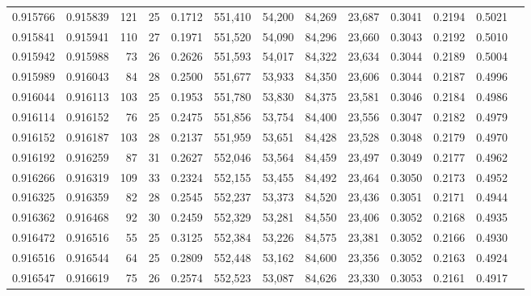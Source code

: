 \begin{tabular}{rrrrrrrrrrrrr}
0.915766 & 0.915839 &   121 &  25 &                                     0.1712 & 551,410 &  54,200 &  84,269 &  23,687 & 0.3041 & 0.2194 & 0.5021 \\
0.915841 & 0.915941 &   110 &  27 &                                     0.1971 & 551,520 &  54,090 &  84,296 &  23,660 & 0.3043 & 0.2192 & 0.5010 \\
0.915942 & 0.915988 &    73 &  26 &                                     0.2626 & 551,593 &  54,017 &  84,322 &  23,634 & 0.3044 & 0.2189 & 0.5004 \\
0.915989 & 0.916043 &    84 &  28 &                                     0.2500 & 551,677 &  53,933 &  84,350 &  23,606 & 0.3044 & 0.2187 & 0.4996 \\
0.916044 & 0.916113 &   103 &  25 &                                     0.1953 & 551,780 &  53,830 &  84,375 &  23,581 & 0.3046 & 0.2184 & 0.4986 \\
0.916114 & 0.916152 &    76 &  25 &                                     0.2475 & 551,856 &  53,754 &  84,400 &  23,556 & 0.3047 & 0.2182 & 0.4979 \\
0.916152 & 0.916187 &   103 &  28 &                                     0.2137 & 551,959 &  53,651 &  84,428 &  23,528 & 0.3048 & 0.2179 & 0.4970 \\
0.916192 & 0.916259 &    87 &  31 &                                     0.2627 & 552,046 &  53,564 &  84,459 &  23,497 & 0.3049 & 0.2177 & 0.4962 \\
0.916266 & 0.916319 &   109 &  33 &                                     0.2324 & 552,155 &  53,455 &  84,492 &  23,464 & 0.3050 & 0.2173 & 0.4952 \\
0.916325 & 0.916359 &    82 &  28 &                                     0.2545 & 552,237 &  53,373 &  84,520 &  23,436 & 0.3051 & 0.2171 & 0.4944 \\
0.916362 & 0.916468 &    92 &  30 &                                     0.2459 & 552,329 &  53,281 &  84,550 &  23,406 & 0.3052 & 0.2168 & 0.4935 \\
0.916472 & 0.916516 &    55 &  25 &                                     0.3125 & 552,384 &  53,226 &  84,575 &  23,381 & 0.3052 & 0.2166 & 0.4930 \\
0.916516 & 0.916544 &    64 &  25 &                                     0.2809 & 552,448 &  53,162 &  84,600 &  23,356 & 0.3052 & 0.2163 & 0.4924 \\
0.916547 & 0.916619 &    75 &  26 &                                     0.2574 & 552,523 &  53,087 &  84,626 &  23,330 & 0.3053 & 0.2161 & 0.4917 \\

\end{tabular}

